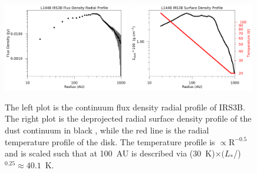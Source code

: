 \begin{figure}[H]
\begin{center}
\includegraphics[width=0.49\textwidth]{img/L1448N-dgr-linear-intensity-c17o_cont.pdf}
\includegraphics[width=0.49\textwidth]{img/L1448N-dustgas-surface-density-loglog.pdf}
\end{center}
\caption{The left plot is the continuum flux density radial profile of IRS3B. The right plot is the deprojected radial surface density profile of the dust continuum in black , while the red line is the radial temperature profile of the disk. The temperature profile is $\propto\text{R}^{-0.5}$ and is scaled such that at 100~AU is described via (30~K)$\times(L_{*}$/\lsun)$^{0.25}\approx40.1$~K.}\label{fig:surfacedensity}
\end{figure}

